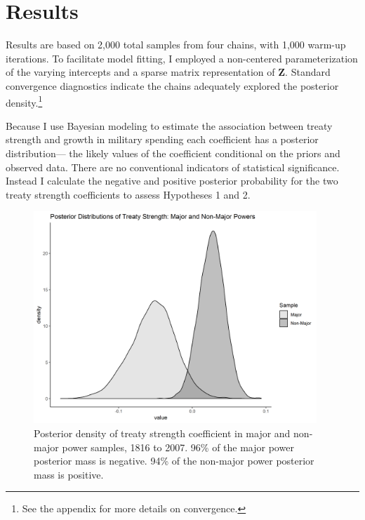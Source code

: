 \documentclass[12pt]{article}
\begin{document}
\section{Results}


Results are based on 2,000 total samples from four chains, with 1,000 warm-up iterations. 
To facilitate model fitting, I employed a non-centered parameterization of the varying intercepts and a sparse matrix representation of \textbf{Z}. 
Standard convergence diagnostics indicate the chains adequately explored the posterior density.\footnote{See the appendix for more details on convergence.} 


Because I use Bayesian modeling to estimate the association between treaty strength and growth in military spending each coefficient has a posterior distribution--- the likely values of the coefficient conditional on the priors and observed data.
There are no conventional indicators of statistical significance. 
Instead I calculate the negative and positive posterior probability for the two treaty strength coefficients to assess Hypotheses 1 and 2.


\begin{figure}[htbp]
	\centering
		\includegraphics[width=0.95\textwidth]{../figures/str-dens.png}
	\caption{Posterior density of treaty strength coefficient in major and non-major power samples, 1816 to 2007. 96\% of the major power posterior mass is negative. 94\% of the non-major power posterior mass is positive.}
	\label{fig:str-dens}
\end{figure}
\end{document}
